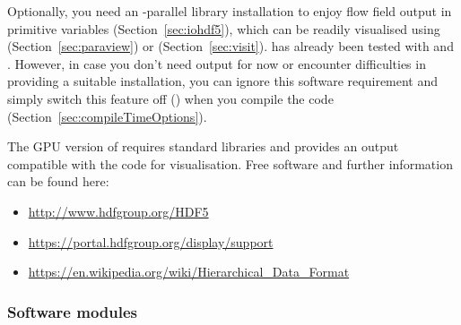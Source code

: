 \documentclass[a4paper, 11pt, DIV=11]{scrartcl}
\begin{document}
Optionally, you need an \mpi-parallel \hdf library installation to
enjoy flow field output in primitive variables (Section~\ref{sec:iohdf5}),
which can be readily visualised using \eg \paraview (Section~\ref{sec:paraview})
or \visit (Section~\ref{sec:visit}). \nsc has already been tested with
 and . However, in case you don't need
\hdf output for now or encounter difficulties in providing a suitable \hdf
installation, you can ignore this software requirement and simply switch this
feature off () when you compile the code
(Section~\ref{sec:compileTimeOptions}). \par 
The GPU version of \nsc requires standard \hdf libraries and provides an output
compatible with the \fortran code for visualisation.
Free software and further information can
be found here:
\begin{itemize}
\item \url{http://www.hdfgroup.org/HDF5}
\item \url{https://portal.hdfgroup.org/display/support}
\item \url{https://en.wikipedia.org/wiki/Hierarchical_Data_Format}
\end{itemize}

\subsubsection{Software modules}
\label{sec:softwareModules}
\end{document}
